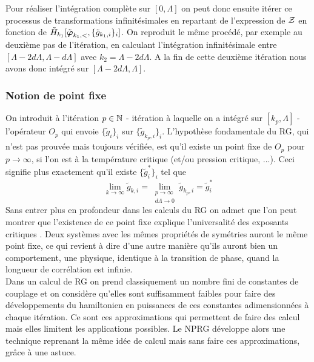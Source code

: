 \documentclass[10.5pt]{article}
\begin{document}
\begin{multicols}{2}
 Pour réaliser l'intégration complète sur $[0, \Lambda]$ on peut donc ensuite itérer ce processus de transformations infinitésimales en repartant de l'expression de $\mathcal{Z}$ en fonction de $\tilde{H}_{k_1}[\tilde{\boldsymbol{ \varphi}}_{k_1,<}, \{\tilde{g}_{k_1, i}\}_i ]$. On reproduit le même procédé, par exemple au deuxième pas de l'itération, en calculant l'intégration infinitésimale entre $[\Lambda - 2d\Lambda, \Lambda - d\Lambda]$ avec $k_2 = \Lambda - 2d\Lambda$. A la fin de cette deuxième itération nous avons donc intégré sur $[\Lambda - 2d\Lambda, \Lambda]$.  \\
 
 
 \subsubsection{Notion de point fixe}
 
On introduit à l'itération $p \in \mathbb{N}$ - itération à laquelle on a intégré sur $[k_p, \Lambda]$ - l'opérateur $O_p$ qui envoie $\{\tilde{g}_i\}_i$ sur $\{\tilde{g}_{k_p,i}\}_i$. L'hypothèse fondamentale du RG, qui n'est pas prouvée mais toujours vérifiée, est qu'il existe un point fixe de $O_p$ pour $p \to \infty$, si l'on est à la température critique (et/ou pression critique, ...). Ceci signifie plus exactement qu'il existe $\{\tilde{g}^*_i\}_i$ tel que 
 \begin{equation}
 	\lim\limits_{k \rightarrow \infty}  \tilde{g}_{k,i} = \lim\limits_{\substack{p \to \infty \\ d\Lambda \to 0 }}  \tilde{g}_{k_p,i} =  \tilde{g}^*_i
 \end{equation} 
Sans entrer plus en profondeur dans les calculs du RG on admet que l'on peut montrer que l'existence de ce point fixe explique l'universalité des exposants critiques \cite{Delamotte2012}. Deux systèmes avec les mêmes propriétés de symétries auront le même point fixe, ce qui revient à dire d'une autre manière qu'ils auront bien un comportement, une physique, identique à la transition de phase, quand la longueur de corrélation est infinie. \\
 
Dans un calcul de RG on prend classiquement un nombre fini de constantes de couplage et on considère qu'elles sont suffisamment faibles pour faire des développements du hamiltonien en puissances de ces constantes adimensionnées à chaque itération. Ce sont ces approximations qui permettent de faire des calcul mais elles limitent les applications possibles. Le NPRG développe alors une technique reprenant la même idée de calcul mais sans faire ces approximations, grâce à une astuce.


\end{multicols}
\end{document}
